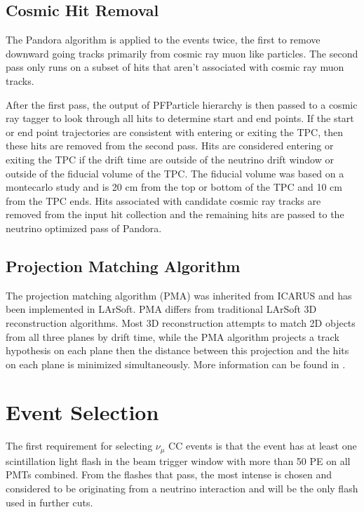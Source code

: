 \subsection{Cosmic Hit Removal}
The Pandora algorithm is applied to the events twice, the first to remove downward going tracks primarily from cosmic ray muon like particles. The second pass only runs on a subset of hits that aren't associated with cosmic ray muon tracks. 

After the first pass, the output of PFParticle hierarchy is then passed to a cosmic ray tagger to look through all hits to determine start and end points. If the start or end point trajectories are consistent with entering or exiting the TPC, then these hits are removed from the second pass. Hits are considered entering or exiting the TPC if the drift time are outside of the neutrino drift window or outside of the fiducial volume of the TPC. The fiducial volume was based on a montecarlo study and is 20 cm from the top or bottom of the TPC and 10 cm from the TPC ends. Hits associated with candidate cosmic  ray tracks are removed from the input hit collection and the remaining hits are passed to the neutrino optimized pass of Pandora.


\subsection{Projection Matching Algorithm}
The projection matching algorithm (PMA) was inherited from ICARUS and has been implemented in LArSoft. PMA differs from traditional LArSoft 3D reconstruction algorithms. Most 3D reconstruction attempts to match 2D objects from all three planes by drift time, while the PMA algorithm projects a track hypothesis on each plane then the distance between this projection and the hits on each plane is minimized simultaneously. More information can be found in \cite{PMA}.
\section{Event Selection}\label{section:normalize}
The first requirement for selecting $\nu_{\mu}$ CC events is that the event has at least one scintillation light flash in the beam trigger window with more than 50 PE on all PMTs combined. From the flashes that pass, the most intense is chosen and considered to be originating from a neutrino interaction and will be the only flash used in further cuts. 

